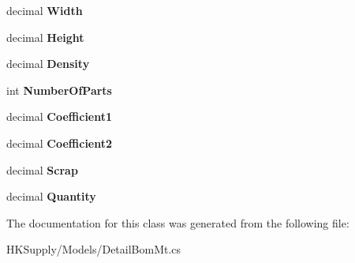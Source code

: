 \begin{DoxyCompactItemize}
decimal {\bfseries Width}
\item 
\mbox{\label{class_h_k_supply_1_1_models_1_1_detail_bom_mt_a79be56435832e62463cbcdb0fe6d1261}} 
decimal {\bfseries Height}
\item 
\mbox{\label{class_h_k_supply_1_1_models_1_1_detail_bom_mt_ae62401acdb9ec95d57f397a8e59ccb54}} 
decimal {\bfseries Density}
\item 
\mbox{\label{class_h_k_supply_1_1_models_1_1_detail_bom_mt_ac2ef5a3864b231c1776cd4a5b3a0f3ee}} 
int {\bfseries Number\+Of\+Parts}
\item 
\mbox{\label{class_h_k_supply_1_1_models_1_1_detail_bom_mt_ac112acdd6d93a8e915fcf7acfe3f537e}} 
decimal {\bfseries Coefficient1}
\item 
\mbox{\label{class_h_k_supply_1_1_models_1_1_detail_bom_mt_a64f4a13332c2522ad308f0291de4483f}} 
decimal {\bfseries Coefficient2}
\item 
\mbox{\label{class_h_k_supply_1_1_models_1_1_detail_bom_mt_aeae6ce4888a8be4337964e1fd51e64e2}} 
decimal {\bfseries Scrap}
\item 
\mbox{\label{class_h_k_supply_1_1_models_1_1_detail_bom_mt_aa859270454c3bfbe1355bc2f8fd7ce22}} 
decimal {\bfseries Quantity}
\end{DoxyCompactItemize}


The documentation for this class was generated from the following file\+:\begin{DoxyCompactItemize}
\item 
H\+K\+Supply/\+Models/Detail\+Bom\+Mt.\+cs\end{DoxyCompactItemize}
